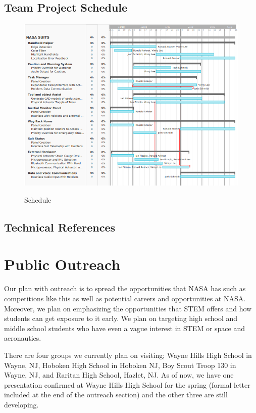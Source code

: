 \documentclass{article}
\let\Oldsection\section
\renewcommand{\section}{\FloatBarrier\Oldsection}
\let\Oldsubsection\subsection
\renewcommand{\subsection}{\FloatBarrier\Oldsubsection}
\begin{document}
\subsection{Team Project Schedule}

\begin{figure}[!htb]
  \centering
  \caption{Schedule}
  \includegraphics[width=1\textwidth]{assets/supertaskschedule.png}
  \label{fig:supertaskschedule}
\end{figure}

\newpage

\subsection{Technical References}

\printbibliography

\newpage

\section{Public Outreach}

Our plan with outreach is to spread the opportunities that NASA has such as competitions like this as well as potential careers and opportunities at NASA. Moreover, we plan on emphasizing the opportunities that STEM offers and how students can get exposure to it early. We plan on targeting high school and middle school students who have even a vague interest in STEM or space and aeronautics.

There are four groups we currently plan on visiting; Wayne Hills High School in Wayne, NJ, Hoboken High School in Hoboken NJ, Boy Scout Troop 130 in Wayne, NJ, and Raritan High School, Hazlet, NJ. As of now, we have one presentation confirmed at Wayne Hills High School for the spring (formal letter included at the end of the outreach section) and the other three are still developing.
\end{document}
